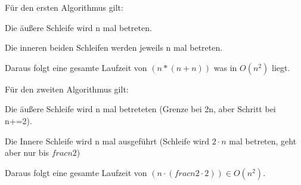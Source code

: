 Für den ersten Algorithmus gilt:

Die äußere Schleife wird n mal betreten.

Die inneren beiden Schleifen werden jeweils n mal betreten.

Daraus folgt eine gesamte Laufzeit von $(n*(n+n))$ was in $O(n^2)$ liegt.



Für den zweiten Algorithmus gilt:

Die äußere Schleife wird n mal betreteten (Grenze bei 2n, aber Schritt bei n+=2).

Die Innere Schleife wird n mal ausgeführt (Schleife wird $2 \cdot n$ mal betreten, geht aber nur bis $ frac{n}{2} $)

Daraus folgt eine gesamte Laufzeit von $(n \cdot (frac{n}{2} \cdot 2) ) \in O(n^2)$.


